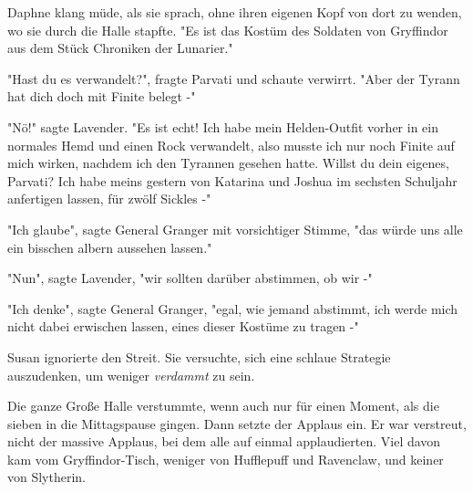 {Daphne klang müde, als sie sprach, ohne ihren eigenen Kopf von dort zu wenden, wo sie durch die Halle stapfte. "Es ist das Kostüm des Soldaten von Gryffindor aus dem Stück Chroniken der Lunarier."

"Hast du es verwandelt?", fragte Parvati und schaute verwirrt. "Aber der Tyrann hat dich doch mit Finite belegt -"

"Nö!" sagte Lavender. "Es ist echt! Ich habe mein Helden-Outfit vorher in ein normales Hemd und einen Rock verwandelt, also musste ich nur noch Finite auf mich wirken, nachdem ich den Tyrannen gesehen hatte. Willst du dein eigenes, Parvati? Ich habe meins gestern von Katarina und Joshua im sechsten Schuljahr anfertigen lassen, für zwölf Sickles -"

"Ich glaube", sagte General Granger mit vorsichtiger Stimme, "das würde uns alle ein bisschen albern aussehen lassen."

"Nun", sagte Lavender, "wir sollten darüber abstimmen, ob wir -"

"Ich denke", sagte General Granger, "egal, wie jemand abstimmt, ich werde mich nicht dabei erwischen lassen, eines dieser Kostüme zu tragen -"

Susan ignorierte den Streit. Sie versuchte, sich eine schlaue Strategie auszudenken, um weniger \emph{verdammt} zu sein.

Die ganze Große Halle verstummte, wenn auch nur für einen Moment, als die sieben in die Mittagspause gingen. Dann setzte der Applaus ein. Er war verstreut, nicht der massive Applaus, bei dem alle auf einmal applaudierten. Viel davon kam vom Gryffindor-Tisch, weniger von Hufflepuff und Ravenclaw, und keiner von Slytherin.

}
